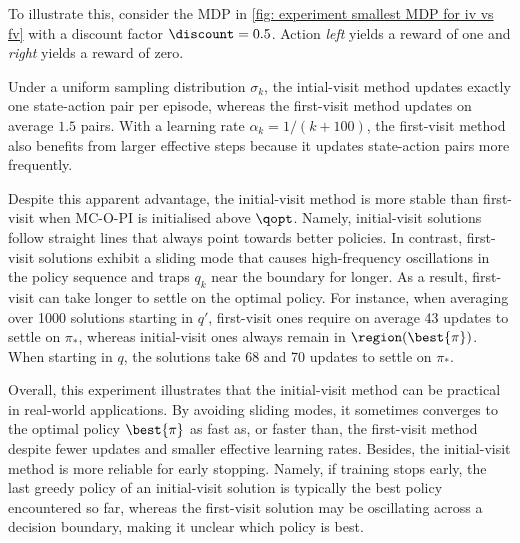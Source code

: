 To illustrate this, consider the MDP in \autoref{fig: experiment smallest MDP for iv vs fv} with a discount factor $\discount = 0.5$. Action \textit{left} yields a reward of one and \textit{right} yields a reward of zero.


Under a uniform sampling distribution $\sigma_k$, the intial-visit method updates exactly one state-action pair per episode, whereas the first-visit method updates on average $1.5$ pairs.
With a learning rate $\alpha_k = 1/(k+100)$, the first-visit method also benefits from larger effective steps because it updates state-action pairs more frequently.



Despite this apparent advantage, the initial-visit method is more stable than first-visit when MC-O-PI is initialised above $\qopt$.
Namely, initial-visit solutions follow straight lines that always point towards better policies.
In contrast, first-visit solutions exhibit a sliding mode that causes high-frequency oscillations in the policy sequence and traps $q_k$ near the boundary for longer.
As a result, first-visit can take longer to settle on the optimal policy.
For instance, when averaging over 1000 solutions starting in $q'$, first-visit ones require on average 43 updates to settle on $\pi_*$, whereas initial-visit ones always remain in $\region(\best{\pi})$.
When starting in $q$, the solutions take 68 and 70 updates to settle on $\pi_*$.


Overall, this experiment illustrates that the initial-visit method can be practical in real-world applications.
By avoiding sliding modes, it sometimes converges to the optimal policy $\best{\pi}$ as fast as, or faster than, the first-visit method despite fewer updates and smaller effective learning rates.
Besides, the initial-visit method is more reliable for early stopping. Namely, if training stops early, the last greedy policy of an initial-visit solution is typically the best policy encountered so far, whereas the first-visit solution may be oscillating across a decision boundary, making it unclear which policy is best.
















